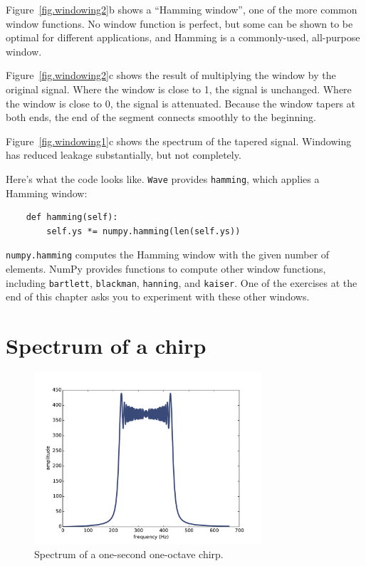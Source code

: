 \documentclass[12pt]{book}
\begin{document}
Figure~\ref{fig.windowing2}b shows a ``Hamming window'', one of the
more common window functions.  No window function is perfect, but some
can be shown to be optimal for different applications, and Hamming
is a commonly-used, all-purpose window.

Figure~\ref{fig.windowing2}c shows the result of multiplying the
window by the original signal.  Where the window is close to 1, the
signal is unchanged.  Where the window is close to 0, the signal is
attenuated.  Because the window tapers at both ends, the end of the
segment connects smoothly to the beginning.

Figure~\ref{fig.windowing1}c shows the spectrum of the tapered signal.
Windowing has reduced leakage substantially, but not completely. 

Here's what the code looks like.  {\tt Wave} provides {\tt hamming},
which applies a Hamming window:

\begin{verbatim}
    def hamming(self):
        self.ys *= numpy.hamming(len(self.ys))
\end{verbatim}

{\tt numpy.hamming} computes the Hamming window with the given number
of elements.  NumPy provides functions to compute other window
functions, including {\tt bartlett}, {\tt blackman}, {\tt hanning},
and {\tt kaiser}.  One of the exercises at the end of this chapter
asks you to experiment with these other windows.


\section{Spectrum of a chirp}

\begin{figure}
\centerline{\includegraphics[height=2.5in]{figs/chirp1.pdf}}
\caption{Spectrum of a one-second one-octave chirp.}
\label{fig.chirp1}
\end{figure}
\end{document}
